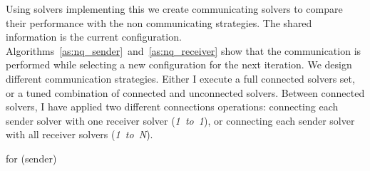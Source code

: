 \begin{table}
\centering 
\renewcommand{\arraystretch}{1}
\caption{Results for \NQP{} (sequential and parallel without communication)}\label{tab:nqueens_seqpar}
\end{table}










Using solvers implementing this \as{} we create communicating solvers to compare their performance with the non communicating strategies. The shared information is the current configuration. Algorithms~\ref{as:nq_sender}~and~\ref{as:nq_receiver} show that the communication is performed while selecting a new configuration for the next iteration. We design different communication strategies. Either I execute a full connected solvers set, or a tuned combination of connected and unconnected solvers. Between connected solvers, I have applied two different connections operations: connecting each sender solver with one receiver solver ({\it 1~to~1}), or connecting each sender solver with all receiver solvers ({\it 1~to~N}).

\begin{algorithm}[H]
\dontprintsemicolon
\SetNoline
{}
\caption{\As{} for \NQP{} (sender)}\label{as:nq_sender}
\end{algorithm}

